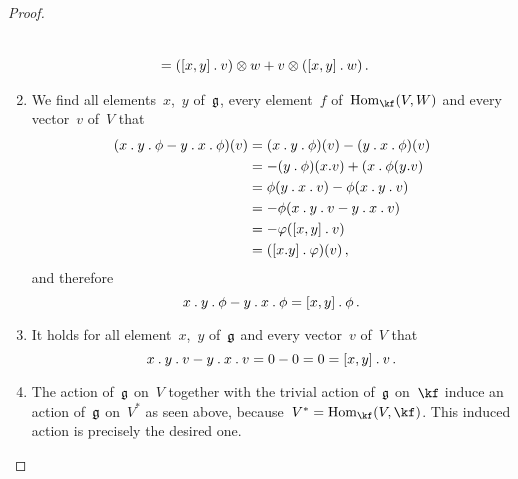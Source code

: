 \begin{proof}
\begin{enumerate}
\begin{align*}
        \\
        ={}&
        ([x,y] \mathbin{.} v) \otimes w
        + v \otimes ([x,y] \mathbin{.} w) \,.
      \end{align*}
    \item
      We find all elements~$x$,~$y$ of~$\mathfrak{g}$, every element~$f$ of~$\Hom_{\kf}(V,W)$ and every vector~$v$ of~$V$ that
      \begin{align*}
        (x \mathbin{.} y \mathbin{.} \phi - y \mathbin{.} x \mathbin{.} \phi)(v)
        &=
        (x \mathbin{.} y \mathbin{.} \phi)(v) - (y \mathbin{.} x \mathbin{.} \phi)(v)
        \\
        &=
        -(y \mathbin{.} \phi)(x.v) + (x \mathbin{.} \phi(y.v)
        \\
        &=
        \phi(y \mathbin{.} x \mathbin{.} v) - \phi(x \mathbin{.} y \mathbin{.} v)
        \\
        &=
        -\phi(x \mathbin{.} y \mathbin{.} v - y \mathbin{.} x \mathbin{.} v)
        \\
        &=
        -\varphi([x,y] \mathbin{.} v)
        \\
        &=
        ([x.y] \mathbin{.} \varphi)(v)  \,,
      \end{align*}
      and therefore
      \[
        x \mathbin{.} y \mathbin{.} \phi - y \mathbin{.} x \mathbin{.} \phi
        =
        [x,y] \mathbin{.} \phi \,.
      \]
    \item
      It holds for all element~$x$,~$y$ of~$\mathfrak{g}$ and every vector~$v$ of~$V$ that
      \[
        x \mathbin{.} y \mathbin{.} v - y \mathbin{.} x \mathbin{.} v
        =
        0 - 0
        =
        0
        =
        [x,y] \mathbin{.} v \,.
      \]
    \item
      The action of~$\mathfrak{g}$ on~$V$ together with the trivial action of~$\mathfrak{g}$ on~$\kf$ induce an action of~$\mathfrak{g}$ on~$V^*$ as seen above, because~$V^* = \Hom_{\kf}(V, \kf)$.
      This induced action is precisely the desired one.
    \qedhere
  \end{enumerate}
\end{proof}


